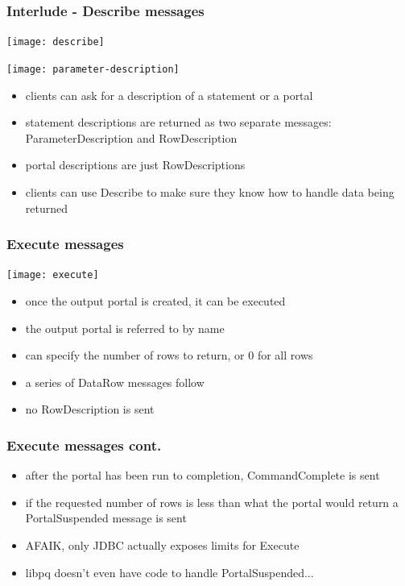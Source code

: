 \documentclass{beamer}
\begin{document}
\begin{frame}
  \frametitle{Interlude - Describe messages}


  \begin{center}
    \texttt{[image: describe]} \\

    \bigskip

    \texttt{[image: parameter-description]}
  \end{center}

  \begin{itemize}
  \item clients can ask for a description of a statement or a portal
  \item \alert{statement} descriptions are returned as two separate messages:
    ParameterDescription and RowDescription
  \item \alert{portal} descriptions are just RowDescriptions
  \item clients can use Describe to make sure they know how to handle data
    being returned
  \end{itemize}
\end{frame}

\begin{frame}
  \frametitle{Execute messages}

  \begin{center}
    \texttt{[image: execute]}
  \end{center}

  \begin{itemize}
  \item once the output portal is created, it can be \alert{executed}
  \item the output portal is referred to by name
  \item can specify the \alert{number of rows} to return, or 0 for all rows
  \item a series of DataRow messages follow
  \item no RowDescription is sent
  \end{itemize}
\end{frame}

\begin{frame}
  \frametitle{Execute messages cont.}

  \begin{itemize}
  \item after the portal has been \alert{run to completion}, CommandComplete is
    sent
  \item if the requested number of rows is \alert{less} than what the portal would
    return a PortalSuspended message is sent
  \item AFAIK, only JDBC actually exposes limits for Execute
  \item libpq doesn't even have code to handle PortalSuspended...
  \end{itemize}
\end{frame}
\end{document}
